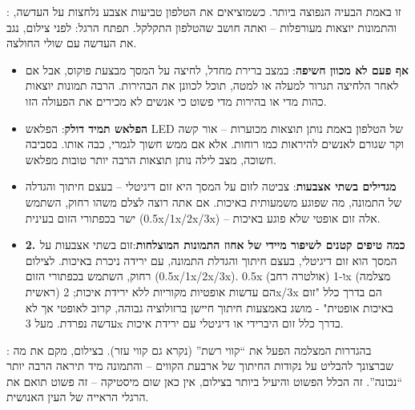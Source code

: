 


: זו באמת הבעיה הנפוצה ביותר. כשמוציאים את הטלפון טביעות אצבע נלחצות על העדשה, והתמונות יוצאות מעורפלות – ואתה חושב שהטלפון התקלקל. תפתח הרגל: לפני צילום, נגב את העדשה עם שולי החולצה.

\begin{itemize}
  \item \textbf{אף פעם לא מכוון חשיפה}: במצב ברירת מחדל, לחיצה על המסך מבצעת פוקוס, אבל אם לאחר הלחיצה תגרור למעלה או למטה, תוכל לכוונן את הבהירות. הרבה תמונות יוצאות כהות מדי או בהירות מדי פשוט כי אנשים לא מכירים את הפעולה הזו.
  \item \textbf{הפלאש תמיד דולק}: הפלאש LED של הטלפון באמת נותן תוצאות מכוערות – אור קשה וקר שגורם לאנשים להיראות כמו רוחות. אלא אם ממש חשוך לגמרי, כבה אותו. בסביבה חשוכה, מצב לילה נותן תוצאות הרבה יותר טובות מפלאש.
  \item \textbf{מגדילים בשתי אצבעות}: צביטה לזום על המסך היא זום דיגיטלי – בעצם חיתוך והגדלה של התמונה, מה שפוגע משמעותית באיכות. אם אתה רוצה לצלם משהו רחוק, השתמש ישר בכפתורי הזום בעינית (0.5x/1x/2x/3x) – אלה זום אופטי שלא פוגע באיכות.
  \item \textbf{2. כמה טיפים קטנים לשיפור מיידי של אחוז התמונות המוצלחות}:זום בשתי אצבעות על המסך הוא זום דיגיטלי, בעצם חיתוך והגדלת התמונה, עם ירידה ניכרת באיכות. לצילום רחוק, השתמש בכפתורי הזום (0.5x/1x/2x/3x). 0.5x (אולטרה רחב) ו-1x (מצלמה ראשית) הם עדשות אופטיות מקוריות ללא ירידת איכות; 2x/3x הם בדרך כלל "זום באיכות אופטית" - מושג באמצעות חיתוך חיישן ברזולוציה גבוהה, קרוב לאופטי אך לא עדשה נפרדת. מעל 3x בדרך כלל זום היברידי או דיגיטלי עם ירידת איכות.
\end{itemize}


: בהגדרות המצלמה הפעל את “קווי רשת” (נקרא גם קווי עזר). בצילום, מקם את מה שברצונך להבליט על נקודות החיתוך של ארבעת הקווים – והתמונה מיד תיראה הרבה יותר “נכונה”. זה הכלל הפשוט והיעיל ביותר בצילום, אין כאן שום מיסטיקה – זה פשוט תואם את הרגלי הראייה של העין האנושית.

